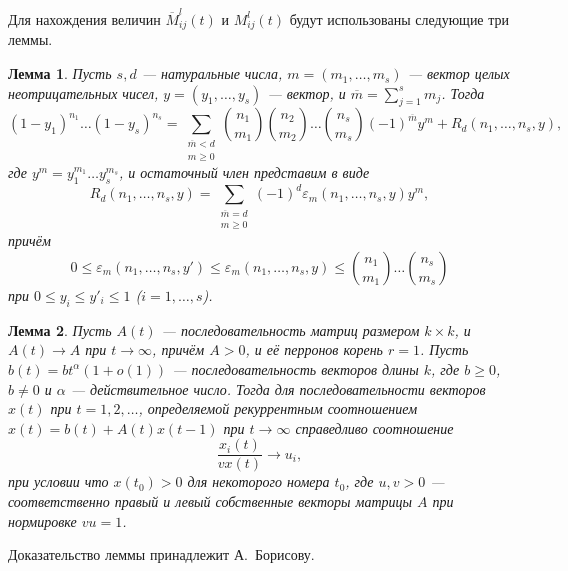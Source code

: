 \documentclass[12pt]{article}
\renewcommand{\leq}{\leqslant}
\renewcommand{\geq}{\geqslant}
\renewcommand{\epsilon}{\varepsilon}
\newtheorem{lemma}{Лемма}
\begin{document}
{Для нахождения величин $\overline{M}^l_{ij}(t)$ и $M^l_{ij}(t)$ будут использованы следующие три леммы.

\begin{lemma}
\label{l:first}
	\cite{sevast-processes} Пусть $s, d$ --- натуральные числа, $m = (m_1, \ldots, m_s)$ --- вектор целых неотрицательных чисел, $y = (y_1, \ldots, y_s)$ --- вектор, и $\overline{m} = \sum_{j = 1}^s m_j$. Тогда
	\begin{equation*}
		(1 - y_1)^{n_1} \ldots (1 - y_s)^{n_s} = \sum_{\substack{\overline{m} < d \\ m \geq 0}} \binom{n_1}{m_1} \binom{n_2}{m_2} \ldots \binom{n_s}{m_s} (-1)^{\overline{m}} y^m + R_d(n_1, \ldots, n_s, y),
	\end{equation*}
	где $y^m = y_1^{m_1} \ldots y_s^{m_s}$, и остаточный член представим в виде
	\begin{equation*}
		R_d(n_1, \ldots, n_s, y) = \sum_{\substack{\overline{m} = d \\ m \geq 0}} (-1)^d \epsilon_m(n_1, \ldots, n_s, y) y^m,
	\end{equation*}
	причём
	\begin{equation*}
		0 \leq \epsilon_m(n_1, \ldots, n_s, y') \leq \epsilon_m(n_1, \ldots, n_s, y) \leq \binom{n_1}{m_1} \ldots \binom{n_s}{m_s}
	\end{equation*}
	при $0 \leq y_i \leq y'_i \leq 1$ ($i = 1,\ldots,s$).
\end{lemma}

\begin{lemma}
\label{l:Ab}
	Пусть $A(t)$ --- последовательность матриц размером $k \times k$, и $A(t) \rightarrow A$ при $t \rightarrow \infty$, причём $A > 0$, и её перронов корень $r = 1$. Пусть $b(t) = b t^\alpha (1 + o(1))$ --- последовательность векторов длины $k$, где $b \geq 0$, $b \neq 0$ и $\alpha$ --- действительное число. Тогда для последовательности векторов $x(t)$ при $t = 1, 2, \ldots$, определяемой рекуррентным соотношением $x(t) = b(t) + A(t) x(t-1)$ при $t \rightarrow \infty$ справедливо соотношение
	\begin{equation*}
		\frac{x_i(t)}{v x(t)} \rightarrow u_i,
	\end{equation*}
	при условии что $x(t_0) > 0$ для некоторого номера $t_0$, где $u, v > 0$ --- соответственно правый и левый собственные векторы матрицы $A$ при нормировке $vu = 1$.
\end{lemma}
Доказательство леммы принадлежит А.~Борисову.

}
\end{document}
